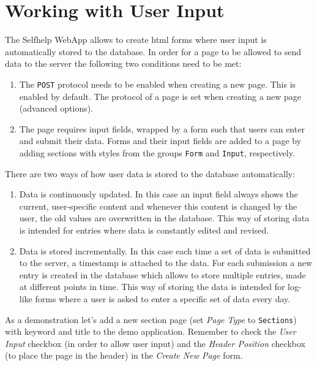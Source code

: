 \documentclass[a4paper,oneside]{book}
\begin{document}
\chapter{Working with User Input}\label{sec.user_input}
The Selfhelp WebApp allows to create html forms where user input is automatically stored to the database.
In order for a page to be allowed to send data to the server the following two conditions need to be met:
\begin{enumerate}
    \item The \texttt{POST} protocol needs to be enabled when creating a new page.
        This is enabled by default.
        The protocol of a page is set when creating a new page (advanced options).
    \item The page requires input fields, wrapped by a form such that users can enter and submit their data.
        Forms and their input fields are added to a page by adding sections with styles from the groups \texttt{Form} and \texttt{Input}, respectively.
\end{enumerate}

There are two ways of how user data is stored to the database automatically:
\begin{enumerate}
    \item Data is continuously updated.
        In this case an input field always shows the current, user-specific content and whenever this content is changed by the user, the old values are overwritten in the database.
        This way of storing data is intended for entries where data is constantly edited and revised.
    \item Data is stored incrementally.
        In this case each time a set of data is submitted to the server, a timestamp is attached to the data.
        For each submission a new entry is created in the database which allows to store multiple entries, made at different points in time.
        This way of storing the data is intended for log-like forms where a user is asked to enter a specific set of data every day.
\end{enumerate}

As a demonstration let's add a new section page (set \emph{Page Type} to \texttt{Sections}) with keyword  and title  to the demo application.
Remember to check the \emph{User Input} checkbox (in order to allow user input) and the \emph{Header Position} checkbox (to place the page in the header) in the \emph{Create New Page} form.
\end{document}
